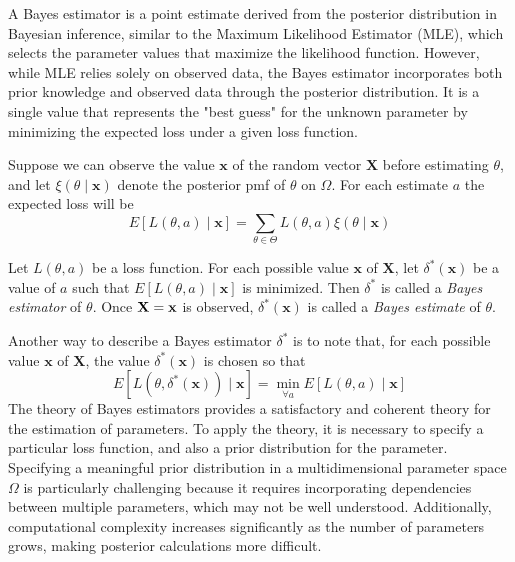 A Bayes estimator is a point estimate derived from the posterior distribution in Bayesian inference, similar to the Maximum Likelihood Estimator (MLE), which selects the parameter values that maximize the likelihood function. However, while MLE relies solely on observed data, the Bayes estimator incorporates both prior knowledge and observed data through the posterior distribution. It is a single value that represents the "best guess" for the unknown parameter by minimizing the expected loss under a given loss function.

Suppose we can observe the value $\mathbf{x}$ of the random vector $\mathbf{X}$ before estimating $\theta$, and let $\xi\left(\theta\mid\mathbf{x}\right)$ denote the posterior pmf of $\theta$ on $\Omega$. For each estimate $a$ the expected loss will be
\[
E\left[L\left(\theta,a\right)\mid\mathbf{x}\right]=\sum_{\theta \in \Theta} L\left(\theta,a\right)\xi\left(\theta\mid\mathbf{x}\right)
\]
\begin{definition}
Let $L\left(\theta,a\right)$ be a loss function. For each possible value $\mathbf{x}$ of $\mathbf{X}$, let $\delta^{\ast}\left(\mathbf{x}\right)$ be a value of $a$ such that $E\left[L\left(\theta,a\right)\mid\mathbf{x}\right]$ is minimized. Then $\delta^{\ast}$ is called a \emph{Bayes estimator} of $\theta$. Once $\mathbf{X=\text{\ensuremath{\mathbf{x}}}}$ is observed, $\delta^{\ast}\left(\mathbf{x}\right)$ is called a \emph{Bayes estimate} of $\theta$.
\end{definition}

Another way to describe a Bayes estimator $\delta^{\ast}$ is to note that, for each possible value $\mathbf{x}$ of $\mathbf{X}$, the value $\delta^{\ast}\left( \mathbf{x} \right)$ is chosen so that
\[
E\left[L\left(\theta, \delta^{\ast}\left(\mathbf{x}\right) \right)\mid \mathbf{x} \right] = \min_{\forall a} E\left[L\left(\theta,a\right)\mid\mathbf{x}\right]
\]
The theory of Bayes estimators provides a satisfactory and coherent theory for the estimation of parameters. To apply the theory, it is necessary to specify a particular loss function, and also a prior distribution for the parameter. Specifying a meaningful prior distribution in a multidimensional parameter space $\Omega$ is particularly challenging because it requires incorporating dependencies between multiple parameters, which may not be well understood. Additionally, computational complexity increases significantly as the number of parameters grows, making posterior calculations more difficult.

%
%


